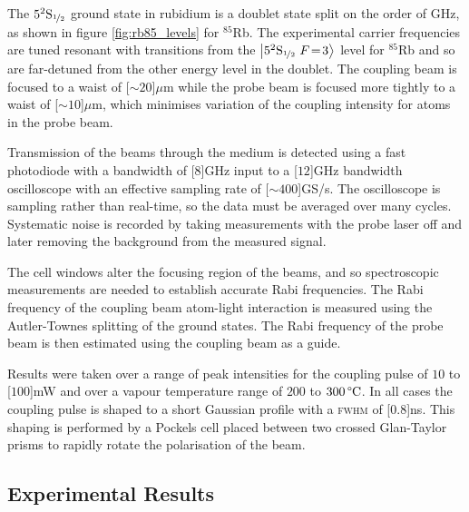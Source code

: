     The $5^2\mathrm{S}_{\nicefrac{1}{2}}$ ground state in rubidium is a doublet
    state split on the order of \unit{GHz}\cite{Arimondo1977}, as shown in
    figure \ref{fig:rb85_levels} for $^{85}$Rb. The experimental carrier
    frequencies are tuned resonant with transitions from the
    $\Ket{5^2\mathrm{S}_{\nicefrac{1}{2}}~F\!=\!3}$ level for $^{85}$Rb and so
    are far-detuned from the other energy level in the doublet. The coupling
    beam is focused to a waist of \unit[${\sim}20$]{$\mu$m} while the probe beam
    is focused more tightly to a waist of \unit[${\sim}10$]{$\mu$m}, which
    minimises variation of the coupling intensity for atoms in the probe
    beam.\cite{Keaveney2013}

    Transmission of the beams through the medium is detected using a fast
    photodiode with a bandwidth of \unit[$8$]{GHz} input to a \unit[$12$]{GHz}
    bandwidth oscilloscope with an effective sampling rate of
    \unit[${\sim}400$]{GS/s}. The oscilloscope is sampling rather than 
    real-time, so the data must be averaged over many cycles. Systematic noise 
    is recorded by taking measurements with the probe laser off and later 
    removing the background from the measured signal.

    The cell windows alter the focusing region of the beams, and so
    spectroscopic measurements are needed to establish accurate Rabi
    frequencies. The Rabi frequency of the coupling beam atom-light interaction
    is measured using the Autler-Townes splitting of the ground states. The Rabi
    frequency of the probe beam is then estimated using the coupling beam as a
    guide.

    Results were taken over a range of peak intensities for the coupling pulse
    of $10$ to \unit[$100$]{mW} and over a vapour temperature range of $200$ to
    $\unit[300]{\textrm{\textdegree C}}$. In all cases the coupling pulse is
    shaped to a short Gaussian profile with a \textsc{fwhm} of \unit[$0.8$]{ns}.
    This shaping is performed by a Pockels cell placed between  two crossed
    Glan-Taylor prisms to rapidly rotate the polarisation of the  beam.

  \subsection{Experimental Results}

